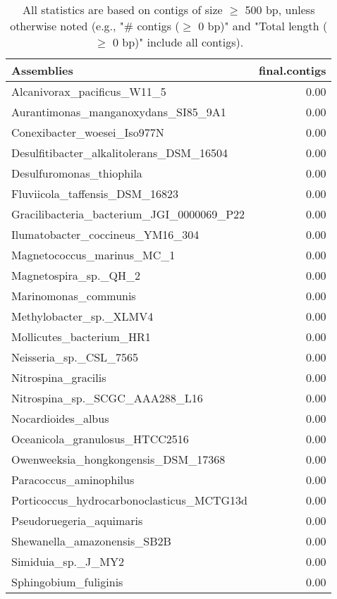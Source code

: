 \documentclass[12pt,a4paper]{article}
\begin{document}
\begin{table}[ht]
\begin{center}
\caption{All statistics are based on contigs of size $\geq$ 500 bp, unless otherwise noted (e.g., "\# contigs ($\geq$ 0 bp)" and "Total length ($\geq$ 0 bp)" include all contigs).}
\begin{tabular}{|l*{1}{|r}|}
\hline
Assemblies & final.contigs \\ \hline
Alcanivorax\_pacificus\_W11\_5 & 0.00 \\ \hline
Aurantimonas\_manganoxydans\_SI85\_9A1 & 0.00 \\ \hline
Conexibacter\_woesei\_Iso977N & 0.00 \\ \hline
Desulfitibacter\_alkalitolerans\_DSM\_16504 & 0.00 \\ \hline
Desulfuromonas\_thiophila & 0.00 \\ \hline
Fluviicola\_taffensis\_DSM\_16823 & 0.00 \\ \hline
Gracilibacteria\_bacterium\_JGI\_0000069\_P22 & 0.00 \\ \hline
Ilumatobacter\_coccineus\_YM16\_304 & 0.00 \\ \hline
Magnetococcus\_marinus\_MC\_1 & 0.00 \\ \hline
Magnetospira\_sp.\_QH\_2 & 0.00 \\ \hline
Marinomonas\_communis & 0.00 \\ \hline
Methylobacter\_sp.\_XLMV4 & 0.00 \\ \hline
Mollicutes\_bacterium\_HR1 & 0.00 \\ \hline
Neisseria\_sp.\_CSL\_7565 & 0.00 \\ \hline
Nitrospina\_gracilis & 0.00 \\ \hline
Nitrospina\_sp.\_SCGC\_AAA288\_L16 & 0.00 \\ \hline
Nocardioides\_albus & 0.00 \\ \hline
Oceanicola\_granulosus\_HTCC2516 & 0.00 \\ \hline
Owenweeksia\_hongkongensis\_DSM\_17368 & 0.00 \\ \hline
Paracoccus\_aminophilus & 0.00 \\ \hline
Porticoccus\_hydrocarbonoclasticus\_MCTG13d & 0.00 \\ \hline
Pseudoruegeria\_aquimaris & 0.00 \\ \hline
Shewanella\_amazonensis\_SB2B & 0.00 \\ \hline
Simiduia\_sp.\_J\_MY2 & 0.00 \\ \hline
Sphingobium\_fuliginis & 0.00 \\ \hline

\end{tabular}
\end{center}
\end{table}
\end{document}
